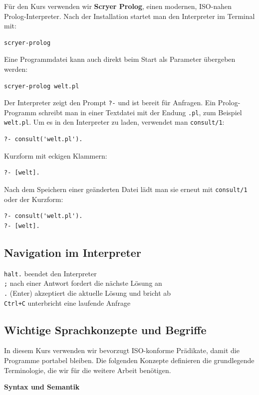 \documentclass[parskip=half,a4paper,11pt]{scrreprt}
\begin{document}
Für den Kurs verwenden wir \textbf{Scryer Prolog}, einen modernen, ISO-nahen Prolog-Interpreter. Nach der Installation startet man den Interpreter im Terminal mit:
\begin{lstlisting}[language=bash, caption={}]
scryer-prolog
\end{lstlisting}
Eine Programmdatei kann auch direkt beim Start als Parameter übergeben werden:
\begin{lstlisting}[language=bash, caption={}]
scryer-prolog welt.pl
\end{lstlisting}
Der Interpreter zeigt den Prompt \texttt{?-} und ist bereit für Anfragen. Ein Prolog-Programm schreibt man in einer Textdatei mit der Endung \texttt{.pl}, zum Beispiel \texttt{welt.pl}. Um es in den Interpreter zu laden, verwendet man \texttt{consult/1}:
\begin{lstlisting}[caption={}]
?- consult('welt.pl').
\end{lstlisting}
Kurzform mit eckigen Klammern:
\begin{lstlisting}[caption={}]
?- [welt].
\end{lstlisting}
Nach dem Speichern einer geänderten Datei lädt man sie erneut mit \texttt{consult/1} oder der Kurzform:
\begin{lstlisting}[caption={}]
?- consult('welt.pl').
?- [welt].
\end{lstlisting}
\subsection{Navigation im Interpreter}

\texttt{halt.} beendet den Interpreter\\
\texttt{;} nach einer Antwort fordert die nächste Lösung an\\
\texttt{.} (Enter) akzeptiert die aktuelle Lösung und bricht ab\\
\texttt{Ctrl+C} unterbricht eine laufende Anfrage\\

\subsection{Wichtige Sprachkonzepte und Begriffe}

In diesem Kurs verwenden wir bevorzugt ISO-konforme Prädikate, damit die Programme portabel bleiben. Die folgenden Konzepte definieren die grundlegende Terminologie, die wir für die weitere Arbeit benötigen.

\textbf{Syntax und Semantik}
\end{document}
